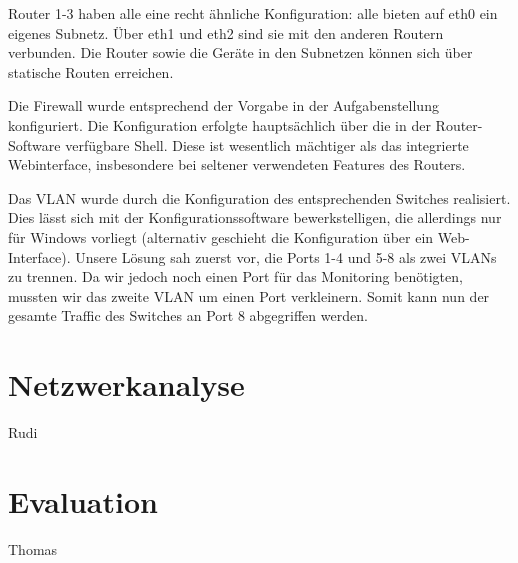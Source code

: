\documentclass[10pt,a4paper]{article}
\begin{document}
	Router 1-3 haben alle eine recht ähnliche Konfiguration: alle bieten auf eth0 ein eigenes Subnetz. Über eth1 und eth2 sind sie mit den anderen Routern verbunden. Die Router sowie die Geräte in den Subnetzen können sich über statische Routen erreichen. \par 
	
	Die Firewall wurde entsprechend der Vorgabe in der Aufgabenstellung konfiguriert. Die Konfiguration erfolgte hauptsächlich über die in der Router-Software verfügbare Shell. Diese ist wesentlich mächtiger als das integrierte Webinterface, insbesondere bei seltener verwendeten Features des Routers. \par 
	
	Das VLAN wurde durch die Konfiguration des entsprechenden Switches realisiert. Dies lässt sich mit der Konfigurationssoftware bewerkstelligen, die allerdings nur für Windows vorliegt (alternativ geschieht die Konfiguration über ein Web-Interface). Unsere Lösung sah zuerst vor,  die Ports 1-4 und 5-8 als zwei VLANs zu trennen. Da wir jedoch noch einen Port für das Monitoring benötigten, mussten wir das zweite VLAN um einen Port verkleinern. Somit kann nun der gesamte Traffic des Switches an Port 8 abgegriffen werden. \par 


\section{Netzwerkanalyse}Rudi


\section{Evaluation}Thomas
\end{document}
